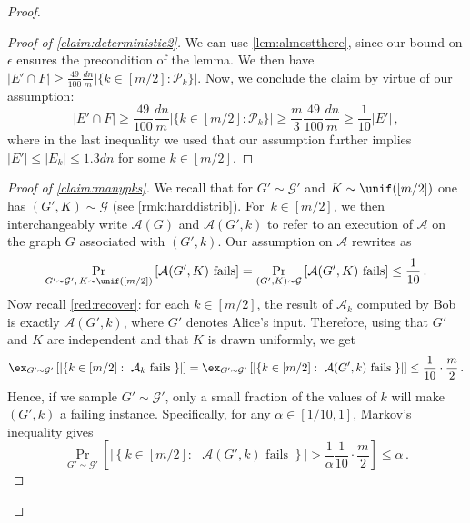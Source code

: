 \begin{proof}
		\begin{proof}[Proof of \cref{claim:deterministic2}]
		We can use \cref{lem:almostthere}, since our bound on $\epsilon$ ensures the precondition of the lemma. We then have $|E' \cap F|  \ge \frac{49}{100} \frac{dn}{m}  |\{k\in [m/2] : \mathcal{P}_k\}| $.  Now, we conclude the claim by virtue of our assumption:
		\begin{equation*}
			|E' \cap F| \ge \frac{49}{100} \frac{dn}{m}  |\{k\in [m/2] : \mathcal{P}_k\}|  \ge \frac{m}{3} \frac{49}{100} \frac{dn}{m} \ge \frac{1}{10} |E'| \, ,
		\end{equation*}
		where in the last inequality we used that our assumption further implies $|E'| \le |E_k| \le 1.3dn$ for some $k \in [m/2]$.
	\end{proof}
	
	
	\begin{proof}[Proof of \cref{claim:manypks}]
		We recall that for $G' \sim \mathcal{G}'$ and $K \sim \unif([m/2])$ one has $(G',K) \sim \mathcal{G}$ (see \cref{rmk:harddistrib}). For~$k \in [m/2]$, we then interchangeably write $\mathcal{A}(G)$ and $\mathcal{A}(G',k)$ to refer to an execution of $\mathcal{A}$ on the graph $G$ associated with $(G',k)$. Our assumption on $\mathcal{A}$ rewrites as
		\begin{equation*}
			\Pr_{G' \sim \mathcal{G}', \, K \sim \unif([m/2])}\left[\text{$\mathcal{A}(G',K)$ fails}\right]  = \Pr_{(G',K) \sim \mathcal{G}}\left[\text{$\mathcal{A}(G',K)$ fails}\right] \le \frac{1}{10} \, .
		\end{equation*}
		Now recall \cref{red:recover}: for each $k \in [m/2]$, the result of $\mathcal{A}_k$ computed by Bob is exactly $\mathcal{A}(G',k)$, where $G'$ denotes Alice's input. Therefore, using that $G'$ and $K$ are independent and that $K$ is drawn uniformly, we get
		\begin{equation*}
			\ex_{G' \sim \mathcal{G}'} \left[ \left| \left\{k \in [m/2] : \text{ $\mathcal{A}_k$ fails }\right\}\right| \right] =\ex_{G' \sim \mathcal{G}'} \left[ \left| \left\{k \in [m/2] : \text{ $\mathcal{A}(G',k)$ fails }\right\}\right| \right] \le \frac{1}{10} \cdot \frac{m}{2} \, .
		\end{equation*}
		Hence, if we sample $G' \sim \mathcal{G}'$, only a small fraction of the values of $k$ will make $(G',k)$ a failing instance. Specifically, for any $\alpha \in [1/10, 1]$, Markov's inequality gives
		\begin{equation*}
			\Pr_{G' \sim \mathcal{G}'}\left[\left| \left\{k \in [m/2] : \text{ $\mathcal{A}(G',k)$ fails }\right\}\right| > \frac{1}{\alpha}  \frac{1}{10} \cdot\frac{m}{2}\right] \le \alpha\, .

\end{equation*}
\end{proof}
\end{proof}
